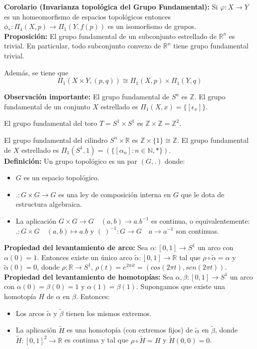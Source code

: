 \documentclass{article}
\begin{document}
\textbf{Corolario (Invarianza topológica del Grupo Fundamental):} Si $\varphi:X\rightarrow Y$ es un homeomorfismo de espacios topológicos entonces $\phi_*:\Pi_1(X,p)\rightarrow \Pi_1(Y,f(p))$ es un isomorfismo de grupos.\\

\textbf{Proposición:} El grupo fundamental de un subconjunto estrellado de $\mathbb{R}^n$ es trivial. En particular, todo subconjunto convexo de $\mathbb{R}^n$ tiene grupo fundamental trivial.

Además, se tiene que 
\begin{equation*}
\Pi_1(X\times Y,(p,q))\cong\Pi_1(X,p)\times \Pi_1(Y,q)
\end{equation*}

\textbf{Observación importante:} El grupo fundamental de $S^n$ es $\mathbb{Z}$. El grupo fundamental de un conjunto $X$ estrellado es $\Pi_1(X,x)=\{[\epsilon_x]\}$.

El grupo fundamental del toro $T=S^1\times S^1$ es $\mathbb{Z}\times \mathbb{Z} = \mathbb{Z}^2$.

El grupo fundamental del cilindro $S^n\times \mathbb{R}$ es $\mathbb{Z}\times\{1\}\cong \mathbb{Z}$. El grupo fundamental de $X$ estrellado es $\Pi_1(S^1,1)=(\{[\alpha_n]:n\in \mathbb{N},*\})$.\\

\textbf{Definición:} Un grupo topológico es un par $(G,.)$ donde:
\begin{itemize}
\item $G$ es un espacio topológico.

\item $.:G\times G\rightarrow G$ es una ley de composición interna en $G$ que le dota de estructura algebraica.

\item La aplicación $G\times G\rightarrow G\quad (a,b)\rightarrow a. b^{-1}$ es continua, o equivalentemente: $.:G\times G\quad (a,b)\mapsto a.b$ y $(~)^{-1}:G\rightarrow G\quad a\rightarrow a^{-1}$ son continuas.
\end{itemize}

\textbf{Propiedad del levantamiento de arco:} Sea $\alpha:[0,1]\rightarrow S^1$ un arco con $\alpha(0)=1$. Entonces existe un único arco $\tilde{\alpha}:[0,1]\rightarrow \mathbb{R}$ tal que $\rho \circ \tilde{\alpha}=\alpha$ y $\tilde{\alpha}(0)=0$, donde $\rho:\mathbb{R}\rightarrow S^1$, $\rho(t)=e^{2\pi it}=(cos(2\pi t), sen(2\pi t))$. \\

\textbf{Propiedad del levantamiento de homotopías:} Sea $\alpha,\beta:[0,1]\rightarrow S^1$ un arco con $\alpha(0)=\beta(0)=1$ y $\alpha(1)=\beta(1)$. Supongamos que existe una homotopía $H$ de $\alpha$ en $\beta$. Entonces:
\begin{itemize}
\item Los arcos $\tilde{\alpha}$ y $\tilde{\beta}$ tienen los mismos extremos.

\item La aplicación $\tilde{H}$ es una homotopía (con extremos fijos) de $\tilde{\alpha}$ en $\tilde{\beta}$, donde $\tilde{H}:[0,1]^2\rightarrow \mathbb{R}$ es continua y tal que $\rho \circ \tilde{H}=H$ y $\tilde{H}(0,0)=0$.
\end{itemize}
\end{document}
